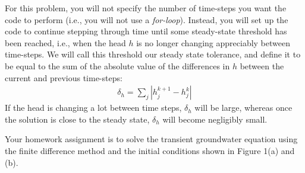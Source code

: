 \documentclass[11pt, oneside]{article}   	%
\begin{document}
For this problem, you will not specify the number of time-steps you want the code to perform (i.e., you will not use a {\it for-loop}).  Instead, you will set up the code to continue stepping through time until some steady-state threshold has been reached, i.e., when the head $h$ is no longer changing appreciably between time-steps.  We will call this threshold our steady state tolerance, and define it to be equal to the sum of the absolute value of the differences in $h$ between the current and previous time-steps:
\begin{eqnarray}
\delta_h = \sum_j | h_j^{k+1} - h_j^k |
\end{eqnarray}
If the head is changing a lot between time steps, $\delta_h$ will be large, whereas once the solution is close to the steady state,  $\delta_h$ will become negligibly small.

Your homework assignment is to solve the transient groundwater equation using the finite difference method and the initial conditions shown in Figure 1(a) and (b). 
\end{document}
